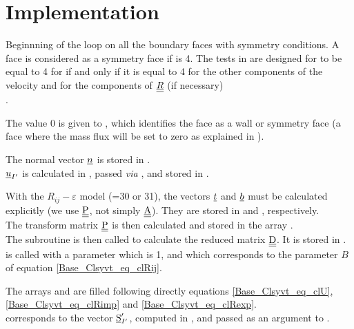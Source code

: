 \section*{Implementation}
\label{Base_Clsyvt_prg_meo}%

Beginnning of the loop on all the boundary faces   with
symmetry conditions.
A face is considered as a symmetry face if
 is 4. The tests in  are designed
 for   to be equal to 4 for  if and only if it is equal
to 4 for the other components of the velocity and for the components of $\underline{\underline{R}}$
(if necessary)\\.

The value 0 is given to  , which identifies the face as a
wall or symmetry face (a face where the mass flux will be set to zero as
explained in ).

The normal vector $\underline{n}$ is stored in .\\
$\underline{u}_{I'}$ is calculated in , passed {\em via} ,
and stored in .

With the $R_{ij}-\varepsilon$ model (=30 or 31), the vectors
 $\underline{t}$ and $\underline{b}$ must be calculated explicitly
(we use $\underline{\underline{\textrm{P}}}$, not simply $\underline{\underline{\textrm{A}}}$).
They are stored in  and
, respectively.\\
The transform matrix $\underline{\underline{\textrm{P}}}$ is then calculated and stored in the array .\\
The subroutine  is then called to calculate the reduced
matrix $\underline{\underline{\textrm{D}}}$. It is stored in .  is called
with a parameter  which is 1, and which corresponds to the parameter
$B$ of equation \ref{Base_Clsyvt_eq_clRij}.


The arrays  and  are filled following directly
equations \ref{Base_Clsyvt_eq_clU}, \ref{Base_Clsyvt_eq_clRimp} and \ref{Base_Clsyvt_eq_clRexp}.\\
 corresponds to the vector $\underline{\textrm{S}}_{I'}^\prime$, computed in
, and passed as an argument to .

